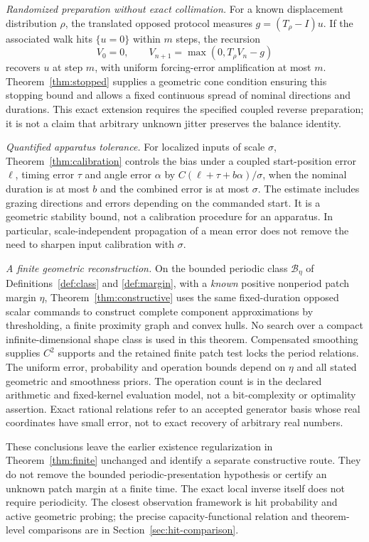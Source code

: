 \smallskip\noindent
\emph{Randomized preparation without exact collimation.}
For a known displacement distribution $\rho$, the translated opposed
protocol measures $g=(T_\rho-I)u$. If the associated walk hits
$\{u=0\}$ within $m$ steps, the recursion
\[
 V_0=0,\qquad V_{n+1}=\max(0,T_\rho V_n-g)
\]
recovers $u$ at step $m$, with uniform forcing-error amplification at
most $m$. Theorem~\ref{thm:stopped} supplies a geometric cone condition
ensuring this stopping bound and allows a fixed continuous spread of
nominal directions and durations. This exact extension requires the
specified coupled reverse preparation; it is not a claim that arbitrary
unknown jitter preserves the balance identity.

\smallskip\noindent
\emph{Quantified apparatus tolerance.}
For localized inputs of scale $\sigma$, Theorem~\ref{thm:calibration}
controls the bias under a coupled start-position error $\ell$, timing
error $\tau$ and angle error $\alpha$ by
$C(\ell+\tau+b\alpha)/\sigma$, when the nominal duration is at most
$b$ and the combined error is at most $\sigma$. The estimate includes
grazing directions and errors depending on the commanded start. It is
a geometric stability bound, not a calibration procedure for an apparatus.
In particular, scale-independent propagation of a mean error does not
remove the need to sharpen input calibration with $\sigma$.

\smallskip\noindent
\emph{A finite geometric reconstruction.}
On the bounded periodic class $\mathcal B_\eta$ of
Definitions~\ref{def:class} and \ref{def:margin}, with a \emph{known}
positive nonperiod patch margin $\eta$, Theorem~\ref{thm:constructive}
uses the same fixed-duration opposed scalar commands to construct
complete component approximations by thresholding, a finite proximity
graph and convex hulls. No search over a compact infinite-dimensional
shape class is used in this theorem. Compensated smoothing supplies
$C^2$ supports and the retained finite patch test locks the period
relations. The uniform error, probability and operation bounds depend
on $\eta$ and all stated geometric and smoothness priors. The operation
count is in the declared arithmetic and fixed-kernel evaluation model,
not a bit-complexity or optimality assertion. Exact rational relations
refer to an accepted generator basis whose real coordinates have small
error, not to exact recovery of arbitrary real numbers.

These conclusions leave the earlier existence regularization in
Theorem~\ref{thm:finite} unchanged and identify a separate constructive
route. They do not remove the bounded periodic-presentation hypothesis
or certify an unknown patch margin at a finite time. The exact local
inverse itself does not require periodicity. The closest observation
framework is hit probability and active geometric probing; the precise
capacity-functional relation and theorem-level comparisons are in
Section~\ref{sec:hit-comparison}.
